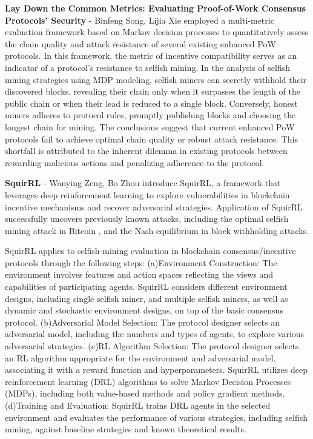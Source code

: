 \textbf{Lay Down the Common Metrics: Evaluating Proof-of-Work Consensus Protocols’ Security} - Binfeng Song, Lijia Xie
\cite{zhang2019lay} employed a multi-metric evaluation framework based on Markov decision processes to quantitatively assess the chain quality and attack resistance of several existing enhanced PoW protocols. In this framework, the metric of incentive compatibility serves as an indicator of a protocol's resistance to selfish mining.
In the analysis of selfish mining strategies using MDP modeling, 
selfish miners can secretly withhold their discovered blocks, revealing their chain only when it surpasses the length of the public chain or when their lead is reduced to a single block. Conversely, honest miners adheres to protocol rules, promptly publishing blocks and choosing the longest chain for mining. The conclusions suggest that current enhanced PoW protocols fail to achieve optimal chain quality or robust attack resistance. This shortfall is attributed to the inherent dilemma in existing protocols between rewarding malicious actions and penalizing adherence to the protocol.

\textbf{SquirRL} - Wanying Zeng, Bo Zhou
\cite{hou2019squirrl} introduce SquirRL, a framework that leverages deep reinforcement learning to explore vulnerabilities in blockchain incentive mechanisms and recover adversarial strategies. Application of SquirRL successfully uncovers previously known attacks, including the optimal selfish mining attack in Bitcoin \cite{sapirshtein2016optimal}, and the Nash equilibrium in block withholding attacks\cite{eyal2015miner}. 

SquirRL applies to selfish-mining evaluation in blockchain consensus/incentive protocols through the following steps:
(a)Environment Construction: The environment involves features and action spaces reflecting the views and capabilities of participating agents. SquirRL considers different environment designs, including single selfish miner, and multiple selfish miners, as well as dynamic and stochastic environment designs, on top of the basic consensus protocol.
(b)Adversarial Model Selection: The protocol designer selects an adversarial model, including the numbers and types of agents, to explore various adversarial strategies.
(c)RL Algorithm Selection: The protocol designer selects an RL algorithm appropriate for the environment and adversarial model, associating it with a reward function and hyperparameters. SquirRL utilizes deep reinforcement learning (DRL) algorithms to solve Markov Decision Processes (MDPs), including both value-based methods and policy gradient methods.
(d)Training and Evaluation: SquirRL trains DRL agents in the selected environment and evaluates the performance of various strategies, including selfish mining, against baseline strategies and known theoretical results.

